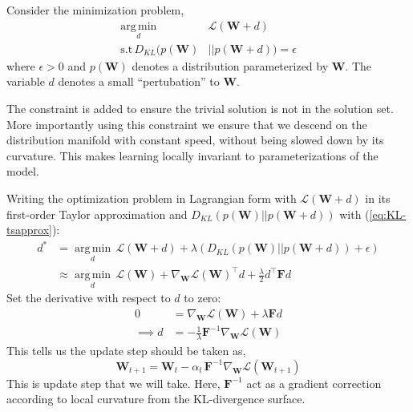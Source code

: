 \documentclass[10pt,twocolumn,letterpaper]{article}
\newcommand{\vect}[1]{\boldsymbol{\mathbf{#1}}}
\DeclareMathOperator*{\argmin}{arg\,min}
\begin{document}
Consider the minimization problem,
\begin{align*}
\underset{d}{\argmin} \, &\mathcal{L}(\vect{W} + d) \\
\mbox{s.t} \, D_{KL}(p(\vect{W}) &|| p(\vect{W}+d)) = \epsilon
\end{align*}
where \(\epsilon > 0\) and \(p(\vect{W})\) denotes a distribution parameterized by \(\vect{W}\). The variable \(d\) denotes a small ``pertubation'' to \(\vect{W}\). 

The constraint is added to ensure the trivial solution is not in the solution set. 
More importantly using this constraint we ensure that we descend on the distribution manifold with constant speed, without being slowed down by its curvature. 
This makes learning locally invariant to parameterizations of the model.

Writing the optimization problem in Lagrangian form with \(\mathcal{L}(\vect{W} + d)\) in its first-order Taylor approximation and \(D_{KL}(p(\vect{W}) || p(\vect{W}+d))\) with (\ref{eq:KL-tsapprox}):
\begin{align*}
    d^{*} &= \underset{d}{\argmin} \, \mathcal{L}(\vect{W} + d) + \lambda  (D_{KL}(p(\vect{W}) || p(\vect{W}+d)) + \epsilon) \\
    &\approx \underset{d}{\argmin} \, \mathcal{L}(\vect{W}) + \nabla_{\vect{W}} \mathcal{L}(\vect{W})^{\intercal}d + \frac{\lambda}{2}d^{\intercal}\vect{F}d
\end{align*}
Set the derivative with respect to \(d\) to zero:
\begin{align*}
    0 &= \nabla_{\vect{W}} \mathcal{L}(\vect{W}) + \lambda \vect{F}d \\
    \implies d &= -\frac{1}{\lambda} \vect{F}^{-1}\nabla_{\vect{W}} \mathcal{L}(\vect{W})
\end{align*}
This tells us the update step should be taken as,
\begin{equation}
    \vect{\vect{W}}_{t+1} = \vect{\vect{W}}_{t} - \alpha_t \, \vect{F}^{-1} \nabla_{\vect{W}} \mathcal{L}(\vect{W}_{t+1})
\end{equation}
This is update step that we will take. Here, \(\vect{F}^{-1}\) act as a gradient correction according to local curvature from the KL-divergence surface.

\end{document}
